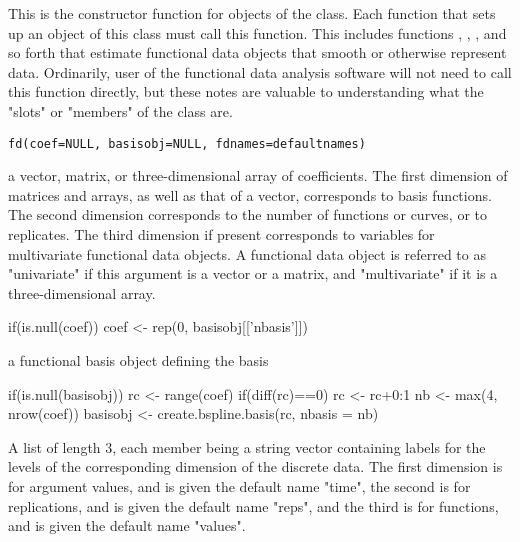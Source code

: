 \documentclass{article}
\begin{document}
\begin{Description}\relax
This is the constructor function for objects of the  class.
Each function that sets up an object of this class must call this
function.  This includes functions ,
, , and so forth that estimate
functional data objects that smooth or otherwise represent data.
Ordinarily, user of the functional data analysis software will not
need to call this function directly, but these notes are valuable to
understanding what the "slots" or "members" of the  class
are.
\end{Description}
\begin{Usage}
\begin{verbatim}
fd(coef=NULL, basisobj=NULL, fdnames=defaultnames)
\end{verbatim}
\end{Usage}
\begin{Arguments}
\begin{ldescription}
\item[\code{coef}] a vector, matrix, or three-dimensional array of coefficients.  The
first dimension of matrices and arrays, as well as that of a vector,
corresponds to basis functions.  The second dimension corresponds to
the number of functions or curves, or to replicates.  The third
dimension if present corresponds to variables for multivariate
functional data objects.  A functional data object is referred to as
"univariate" if this argument is a vector or a matrix, and
"multivariate" if it is a three-dimensional array.

if(is.null(coef)) coef <- rep(0, basisobj[['nbasis']]) 

\item[\code{basisobj}] a functional basis object defining the basis

if(is.null(basisobj)){
rc <- range(coef)
if(diff(rc)==0) rc <- rc+0:1
nb <- max(4, nrow(coef)) 
basisobj <- create.bspline.basis(rc, nbasis = nb)
}

\item[\code{fdnames}] A list of length 3, each member being a string vector containing
labels for the levels of the corresponding dimension of the discrete
data.  The first dimension is for argument values, and is given the
default name "time", the second is for replications, and is given
the default name "reps", and the third is for functions, and is
given the default name "values".  

\end{ldescription}
\end{Arguments}
\end{document}
